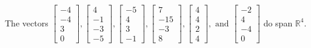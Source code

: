 \begin{exercise}
\begin{exerciseStatement}
  \end{exerciseStatement}
  \begin{exerciseAnswer}
   The vectors \(\left[\begin{array}{r}
-4 \\
-4 \\
3 \\
0
\end{array}\right] , \left[\begin{array}{r}
4 \\
-1 \\
-3 \\
-5
\end{array}\right] , \left[\begin{array}{r}
-5 \\
4 \\
3 \\
-1
\end{array}\right] , \left[\begin{array}{r}
7 \\
-15 \\
-3 \\
8
\end{array}\right] , \left[\begin{array}{r}
4 \\
4 \\
2 \\
4
\end{array}\right] , \text{ and } \left[\begin{array}{r}
-2 \\
4 \\
-4 \\
0
\end{array}\right]\) 
  	 do  
	span \(\mathbb{R}^4\).
  


  \end{exerciseAnswer}
\end{exercise}